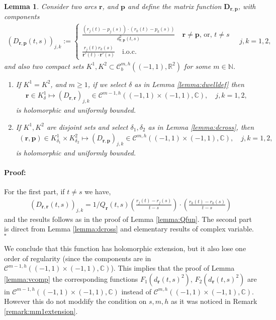 \documentclass{article}
\newtheorem{lemma}[theorem]{Lemma}
\newenvironment{proof}{\paragraph{Proof:}}{\hfill$\square$}
\newcommand{\IC}{{\mathbb C}}
\newcommand{\IN}{{\mathbb N}}
\newcommand{\IR}{{\mathbb R}}
\newcommand{\bp}{{\bm p}}
\newcommand{\cmspaceh}[4]{\mathcal{C}^{#1,#2} \left( #3, #4 \right)}
\newcommand{\rgeoh}[2]{\mathcal{C}_b^{#1,#2}\left( (-1,1), \IR^2 \right)}
\newcommand{\br}{\bm{r}}
\newcommand{\iinterv}{(-1,1)\times(-1,1)}
\begin{document}
\begin{lemma}
\label{lemma:Dmatrix}
Consider two arcs $\br$, and $\bp$ and define the matrix function $\mathbf{D}_{\br,\bp}$, with components
\begin{align*}
(D_{\br,\bp}(t,s))_{j,k} :=  \begin{cases}
\frac{(r_j(t)-p_j(s))\cdot (r_k(t)-p_k(s))}{d_{\br,\bp}^2(t,s)} \quad \br \neq \bp\text{, or, } t \neq s \\
\frac{r_j(t) r_k(s)}{\br'(t)\cdot \br'(s)} \quad \text{i.o.c.} 
\end{cases} \quad j,k=1,2,
\end{align*} 
and also two compact sets $K^1,K^2 \subset \rgeoh{m}{h}$ for some $m \in \IN$. 
\begin{enumerate}
\item
If $K^1 = K^2$, and $m \geq 1$, if we select $\delta$ as in Lemma \ref{lemma:dwelldef} then 
\begin{align*}
\br \in K^1_\delta \mapsto ({D}_{\br,\br})_{j,k} \in \cmspaceh{m-1}{h}{(-1,1)\times(-1,1)}{\IC}, \quad j,k =1,2,
\end{align*} 
is holomorphic and uniformly bounded.
\item 
If $K^1, K^2$ are disjoint sets and select $\delta_1, \delta_2$ as in Lemma \ref{lemma:dcross}, then 
\begin{align*}
(\br,\bp)  \in K^1_{\delta_1} \times K^2_{\delta_2} \mapsto ({D}_{\br,\bp})_{j,k} \in \cmspaceh{m}{h}{(-1,1)\times(-1,1)}{\IC}, \quad j,k =1,2,
\end{align*} 
is holomorphic and uniformly bounded.
\end{enumerate}
\end{lemma} 
\begin{proof}
For the first part, if $t \neq s$ we have, 
\begin{align*}
(D_{\br,\br}(t,s))_{j,k} = 1/Q_{\br}(t,s) \left( \frac{r_j(t)-r_j(s)}{t-s} \right) \cdot \left( \frac{r_k(t)-r_k(s)}{t-s} \right)
\end{align*}
and the results follows as in the proof of Lemma \ref{lemma:Qfun}.
The second part is direct from Lemma \ref{lemma:dcross} and elementary results of complex variable. 
\end{proof}

We conclude that this function has holomorphic extension, but it also lose one order of regularity (since the components are in $\cmspaceh{m-1}{h}{\iinterv}{\IC}$). This implies that the proof of Lemma \ref{lemma:vcomp} the corresponding functions $F_1(d_{\br}(t,s)^2)$, $F_2(d_{\br}(t,s)^2)$ are in $\cmspaceh{m-1}{h}{\iinterv}{\IC}$ instead of $\cmspaceh{m}{h}{\iinterv}{\IC}$.  However this do not moddify the condition on $s,m,h$ as it was noticed in Remark \ref{remark:mm1extension}.
\end{document}

